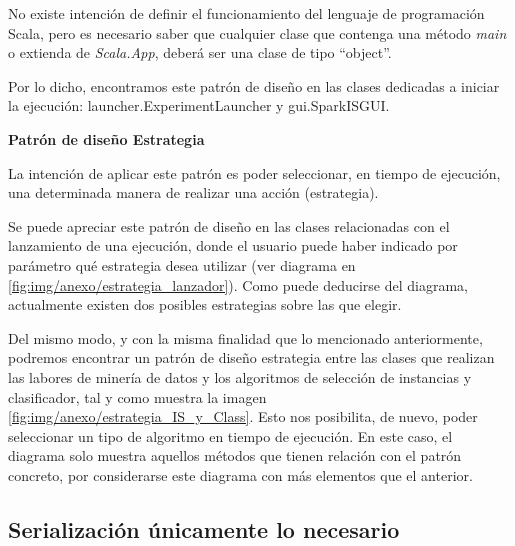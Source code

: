 No existe intención de definir el funcionamiento del lenguaje de programación Scala, pero es necesario saber que cualquier clase que contenga una método \textit{main} o extienda de \textit{Scala.App}, deberá ser una clase de tipo ``object''.

Por lo dicho, encontramos este patrón de diseño en las clases dedicadas a iniciar la ejecución: launcher.ExperimentLauncher y gui.SparkISGUI.


\textbf{Patrón de diseño Estrategia}

La intención de aplicar este patrón es poder seleccionar, en tiempo de ejecución, una determinada manera de realizar una acción (estrategia).

Se puede apreciar este patrón de diseño en las clases relacionadas con el lanzamiento de una ejecución, donde el usuario puede haber indicado por parámetro qué estrategia desea utilizar (ver diagrama en \ref{fig:img/anexo/estrategia_lanzador}). Como puede deducirse del diagrama, actualmente existen dos posibles estrategias sobre las que elegir. 


Del mismo modo, y con la misma finalidad que lo mencionado anteriormente, podremos encontrar un patrón de diseño estrategia entre las clases que realizan las labores de minería de datos y los algoritmos de selección de instancias y clasificador, tal y como muestra la imagen \ref{fig:img/anexo/estrategia_IS_y_Class}. Esto nos posibilita, de nuevo, poder seleccionar un tipo de algoritmo en tiempo de ejecución. En este caso, el diagrama solo muestra aquellos métodos que tienen relación con el patrón concreto, por considerarse este diagrama con más elementos que el anterior.





\subsection{Serialización únicamente lo necesario}

